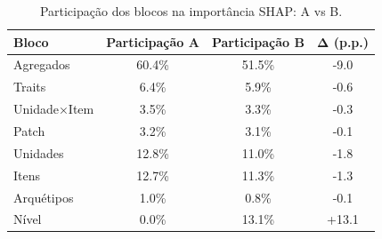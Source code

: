 \begin{table}[htbp]
\caption{Participação dos blocos na importância SHAP: A vs B.}
\label{tab:abblk}
\centering
\small
\begin{tabular}{lccc}
\toprule
Bloco & Participação A & Participação B & Δ (p.p.) \\
\midrule
Agregados & 60.4\% & 51.5\% & -9.0 \\
Traits & 6.4\% & 5.9\% & -0.6 \\
Unidade×Item & 3.5\% & 3.3\% & -0.3 \\
Patch & 3.2\% & 3.1\% & -0.1 \\
Unidades & 12.8\% & 11.0\% & -1.8 \\
Itens & 12.7\% & 11.3\% & -1.3 \\
Arquétipos & 1.0\% & 0.8\% & -0.1 \\
Nível & 0.0\% & 13.1\% & +13.1 \\
\bottomrule
\end{tabular}
\end{table}
